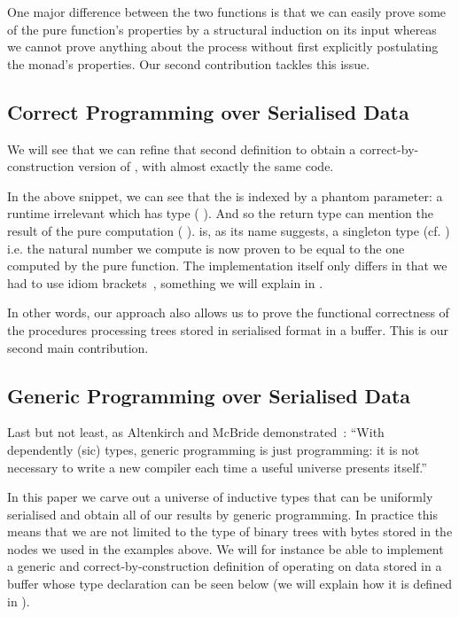 One major difference between the two functions is that
we can easily prove some of the pure function's properties by a structural
induction on its input whereas we
cannot prove anything about the  process without first
explicitly postulating the  monad's properties.
%
Our second contribution tackles this issue.

\subsection{Correct Programming over Serialised Data}

We will see that we can refine that second definition to obtain
a correct-by-construction version of
, with almost exactly the same code.


In the above snippet, we can see that the  is indexed
by a phantom parameter: a runtime irrelevant  which has type
( ).
%
And so the return type can mention the result of the pure computation
( ).
%
 is, as its name suggests, a singleton type
(cf. )
i.e. the natural number we compute is now proven to be equal to the
one computed by the pure  function.
%
The implementation itself only differs in that we had to use idiom
brackets~\citep{DBLP:journals/jfp/McbrideP08}, something we will explain
in .

In other words, our approach also allows us to prove the functional
correctness of the  procedures processing trees stored
in serialised format in a buffer. This is our second main contribution.

\subsection{Generic Programming over Serialised Data}

Last but not least, as Altenkirch and McBride
demonstrated~\citep{DBLP:conf/ifip2-1/AltenkirchM02}:
``With dependently (sic) types, generic programming is just programming:
it is not necessary to write a new compiler each time a useful
universe presents itself.''

In this paper we carve out a universe of inductive types that can be
uniformly serialised and obtain all of our results by generic programming.
%
In practice this means that we are not limited to the type of binary trees
with bytes stored in the nodes we used in the examples above.
%
We will for instance be able to implement
a generic and correct-by-construction
definition of  operating on data stored in a buffer
whose type declaration can be seen below
(we will explain how it is defined in ).

